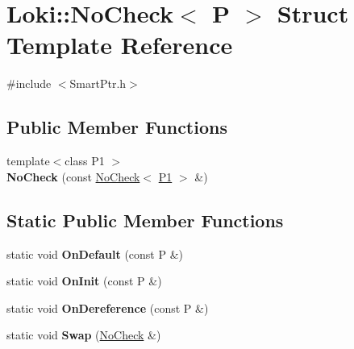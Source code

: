 \hypertarget{structLoki_1_1NoCheck}{}\section{Loki\+:\+:No\+Check$<$ P $>$ Struct Template Reference}
\label{structLoki_1_1NoCheck}


{\ttfamily \#include $<$Smart\+Ptr.\+h$>$}

\subsection*{Public Member Functions}
\begin{DoxyCompactItemize}
\item 
\hypertarget{structLoki_1_1NoCheck_ad08bbf1a2a8ff61f6085d525bea87202}{}{\footnotesize template$<$class P1 $>$ }\\{\bfseries No\+Check} (const \hyperlink{structLoki_1_1NoCheck}{No\+Check}$<$ \hyperlink{structP1}{P1} $>$ \&)\label{structLoki_1_1NoCheck_ad08bbf1a2a8ff61f6085d525bea87202}

\end{DoxyCompactItemize}
\subsection*{Static Public Member Functions}
\begin{DoxyCompactItemize}
\item 
\hypertarget{structLoki_1_1NoCheck_a220f98d14c4bf979103bd04128e1a1f1}{}static void {\bfseries On\+Default} (const P \&)\label{structLoki_1_1NoCheck_a220f98d14c4bf979103bd04128e1a1f1}

\item 
\hypertarget{structLoki_1_1NoCheck_a7d9879cb07dbae3a6f4f3ac343cf719f}{}static void {\bfseries On\+Init} (const P \&)\label{structLoki_1_1NoCheck_a7d9879cb07dbae3a6f4f3ac343cf719f}

\item 
\hypertarget{structLoki_1_1NoCheck_acf13ecd71853866cb982776efd15c495}{}static void {\bfseries On\+Dereference} (const P \&)\label{structLoki_1_1NoCheck_acf13ecd71853866cb982776efd15c495}

\item 
\hypertarget{structLoki_1_1NoCheck_a3b9388da77f3add0890816f91022ba22}{}static void {\bfseries Swap} (\hyperlink{structLoki_1_1NoCheck}{No\+Check} \&)\label{structLoki_1_1NoCheck_a3b9388da77f3add0890816f91022ba22}

\end{DoxyCompactItemize}


